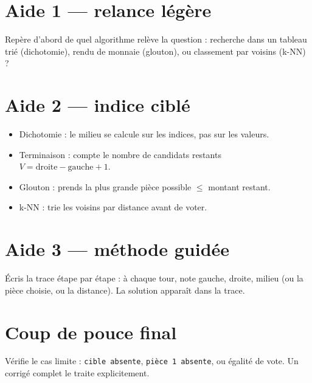 \documentclass[a4paper,11pt]{article}
\begin{document}

\section*{Aide 1 — relance légère}
Repère d'abord de quel algorithme relève la question : recherche dans un tableau trié (dichotomie), rendu de monnaie (glouton), ou classement par voisins (k-NN) ?

\section*{Aide 2 — indice ciblé}
\begin{itemize}[nosep]
  \item Dichotomie : le milieu se calcule sur les indices, pas sur les valeurs.
  \item Terminaison : compte le nombre de candidats restants $V = \text{droite} - \text{gauche} + 1$.
  \item Glouton : prends la plus grande pièce possible $\leq$ montant restant.
  \item k-NN : trie les voisins par distance avant de voter.
\end{itemize}

\section*{Aide 3 — méthode guidée}
Écris la trace étape par étape : à chaque tour, note gauche, droite, milieu (ou la pièce choisie, ou la distance). La solution apparaît dans la trace.

\section*{Coup de pouce final}
Vérifie le cas limite : \texttt{cible absente}, \texttt{pièce 1 absente}, ou égalité de vote. Un corrigé complet le traite explicitement.
\end{document}

